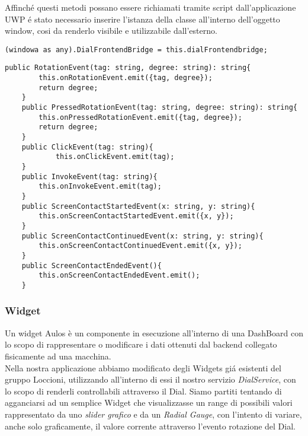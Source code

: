 Affinché questi metodi possano essere richiamati tramite script dall'applicazione UWP é stato necessario inserire l'istanza della classe all'interno dell'oggetto window, cosi da renderlo visibile e utilizzabile dall'esterno.\\

\vspace{1.0cm}
\begin{lstlisting}[caption={Inserimento DialFrontendbridge in window },style=javaScriptCode]
(windowa as any).DialFrontendBridge = this.dialFrontendbridge;
\end{lstlisting} 
\vspace{1.0cm}

\newpage
\vspace{1.0cm}
\begin{lstlisting}[caption={Metodi esposti DialFrontendBridge},style=javaScriptCode]
    public RotationEvent(tag: string, degree: string): string{
        this.onRotationEvent.emit({tag, degree});
        return degree;
    }
    public PressedRotationEvent(tag: string, degree: string): string{
        this.onPressedRotationEvent.emit({tag, degree});
        return degree;
    }
    public ClickEvent(tag: string){
            this.onClickEvent.emit(tag);
    }
    public InvokeEvent(tag: string){
        this.onInvokeEvent.emit(tag);
    }
    public ScreenContactStartedEvent(x: string, y: string){
        this.onScreenContactStartedEvent.emit({x, y});
    }
    public ScreenContactContinuedEvent(x: string, y: string){
        this.onScreenContactContinuedEvent.emit({x, y});
    }
    public ScreenContactEndedEvent(){
        this.onScreenContactEndedEvent.emit();
    }
\end{lstlisting} 

\subsubsection{Widget}

Un widget Aulos è un componente in esecuzione all’interno di una DashBoard con lo scopo di rappresentare o modificare i dati ottenuti dal backend collegato fisicamente ad una macchina.\\

Nella nostra applicazione abbiamo modificato degli Widgets giá esistenti del gruppo Loccioni, utilizzando all'interno di essi il nostro servizio \emph{DialService}, con lo scopo di renderli controllabili attraverso il Dial. Siamo partiti tentando di agganciarsi ad un semplice Widget che visualizzasse un range di possibili valori rappresentato da uno \emph{slider grafico} e da un \emph{Radial Gauge}, con l'intento di variare, anche solo graficamente, il valore corrente attraverso l'evento rotazione del Dial.\\

